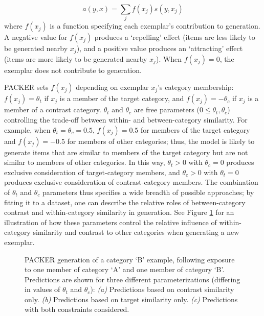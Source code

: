 \documentclass[12pt]{article}
\newcommand\inputpgf[2]{{
\let\pgfimageWithoutPath\pgfimage
\renewcommand{\pgfimage}[2][]{\pgfimageWithoutPath[##1]{#1/##2}}

}}
\begin{document}
\begin{flushleft}
\begin{equation} a(y, x) = \sum_j{f(x_j) s(y, x_j)}
\end{equation}
% 
where $f(x_j)$ is a function specifying each exemplar's contribution to
generation. A negative value for $f(x_j)$ produces a `repelling' effect (items
are less likely to be generated nearby $x_j$), and a positive value produces an
`attracting' effect (items are more likely to be generated nearby $x_j$). When
$f(x_j)=0$, the exemplar does not contribute to generation.

PACKER sets $f(x_j)$ depending on exemplar $x_j$'s category membership:
$f(x_j) = \theta_t$ if $x_j$ is a member of the target category, and
$f(x_j) = -\theta_c$ if $x_j$ is a member of a contrast category. $\theta_t$ and
$\theta_c$ are free parameters ($0 \leq \theta_t,\theta_c$) controlling the
trade-off between within- and between-category similarity. For example, when
$\theta_t = \theta_c = 0.5$, $f(x_j) = 0.5$ for members of the target category
and $f(x_j) = -0.5$ for members of other categories; thus, the model is likely
to generate items that are similar to members of the target category but are not
similar to members of other categories. In this way, $\theta_t > 0$ with
$\theta_c = 0$ produces exclusive consideration of target-category members, and
$\theta_c > 0$ with $\theta_t = 0$ produces exclusive consideration of
contrast-category members. The combination of $\theta_t$ and $\theta_c$
parameters thus specifies a wide breadth of possible approaches; by fitting it
to a dataset, one can describe the relative roles of between-category contrast
and within-category similarity in generation. See Figure
\ref{fig:packer-examples} for an illustration of how these parameters control
the relative influence of within-category similarity and contrast to other
categories when generating a new exemplar.

\begin{figure}
	\begin{center} \inputpgf{figs/}{packer-examples.pgf}
      \caption{PACKER generation of a category `B' example, following exposure
        to one member of category `A' and one member of category `B'.
        Predictions are shown for three different parameterizations (differing
        in values of $\theta_t$ and $\theta_c$): {\em (a)}
        Predictions based on contrast similarity only. {\em (b)}
        Predictions based on target similarity only. {\em (c)} Predictions with
        both constraints considered.}
		\label{fig:packer-examples}
	\end{center}
\end{figure}


\end{flushleft}
\end{document}
